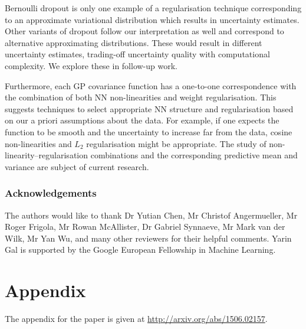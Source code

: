 \documentclass{article}
\theoremstyle{definition}
\begin{document}
Bernoulli dropout is only one example of a regularisation technique corresponding to an approximate variational distribution which results in uncertainty estimates. Other variants of dropout %
follow our interpretation as well and correspond to alternative approximating distributions. These would result in different uncertainty estimates, trading-off uncertainty quality with computational complexity. We explore these in follow-up work.

Furthermore, each GP covariance function has a one-to-one correspondence with the combination of both NN non-linearities and weight regularisation. This suggests techniques to select appropriate NN structure and regularisation based on our a priori assumptions about the data. For example, if one expects the function to be smooth and the uncertainty to increase far from the data, cosine non-linearities and $L_2$ regularisation might be appropriate. The study of non-linearity--regularisation combinations and the corresponding predictive mean and variance are subject of current research.

\subsubsection*{Acknowledgements}
The authors would like to thank Dr Yutian Chen, Mr Christof Angermueller, Mr Roger Frigola, Mr Rowan McAllister, Dr Gabriel Synnaeve, Mr Mark van der Wilk, Mr Yan Wu, and many other reviewers for their helpful comments. Yarin Gal is supported by the Google European Fellowship in Machine Learning. %






\newpage
\appendix

\section{Appendix}
The appendix for the paper is given at \url{http://arxiv.org/abs/1506.02157}.
\end{document}
